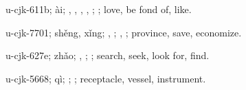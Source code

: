 \begin{multicols}{2}
{\cjkgGlue{}u-cjk-611b; ài; \cjkgGlue{}\cjkgGlue{}\cjkgGlue{}, \cjkgGlue{}\cjkgGlue{}\cjkgGlue{}, \cjkgGlue{}\cjkgGlue{}\cjkgGlue{}, \cjkgGlue{}\cjkgGlue{}\cjkgGlue{}, \cjkgGlue{}; \cjkgGlue{}; love, be fond of, like.

\cjkgGlue{}u-cjk-7701; shěng, xǐng; \cjkgGlue{}\cjkgGlue{}\cjkgGlue{}, \cjkgGlue{}\cjkgGlue{}\cjkgGlue{}; \cjkgGlue{}, \cjkgGlue{}; province, save, economize.

\cjkgGlue{}u-cjk-627e; zhǎo; \cjkgGlue{}, \cjkgGlue{}; \cjkgGlue{}; search, seek, look for, find.

\cjkgGlue{}u-cjk-5668; qì; \cjkgGlue{}; \cjkgGlue{}; receptacle, vessel, instrument.

}
\end{multicols}
